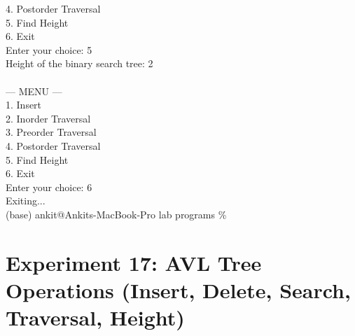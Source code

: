\documentclass[12pt,a4paper]{article}
\begin{document}
\begin{tcolorbox}[terminalstyle, title=Sample Output]
{4. Postorder Traversal\\
5. Find Height\\
6. Exit\\
Enter your choice: 5\\
Height of the binary search tree: 2\\
\\
--- MENU ---\\
1. Insert\\
2. Inorder Traversal\\
3. Preorder Traversal\\
4. Postorder Traversal\\
5. Find Height\\
6. Exit\\
Enter your choice: 6\\
Exiting...\\
(base) ankit@Ankits-MacBook-Pro lab programs \%
}
\end{tcolorbox}


\newpage
\section*{Experiment 17: AVL Tree Operations (Insert, Delete, Search, Traversal, Height)}
\end{document}
